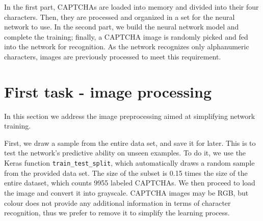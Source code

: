 In the first part, CAPTCHAs are loaded into memory and divided into
their four characters. Then, they are processed and organized in a set
for the neural network to use. In the second part, we build the neural
network model and complete the training; finally, a CAPTCHA image is
randomly picked and fed into the network for recognition. As the network
recognizes only alphanumeric characters, images are previously processed
to meet this requirement.

\vspace{1.5cm} \par
\section*{First task - image
processing}\label{first-task---image-processing}

In this section we address the image preprocessing aimed at simplifying
network training.

First, we draw a sample from the entire data set, and save it for later.
This is to test the network's predictive ability on unseen examples. To
do it, we use the Keras function \texttt{train\_test\_split}, which
automatically draws a random sample from the provided data set. The size
of the subset is 0.15 times the size of the entire dataset, which counts
9955 labeled CAPTCHAs. We then proceed to load the image and convert it
into grayscale. CAPTCHA images may be RGB, but colour does not provide
any additional information in terms of character recognition, thus we
prefer to remove it to simplify the learning process.

